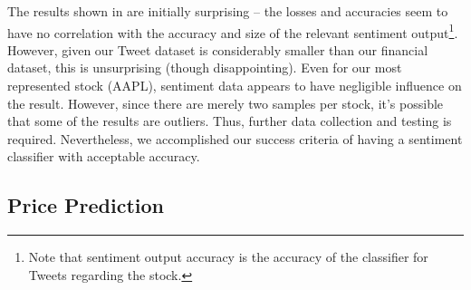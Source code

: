 \documentclass[12pt,a4paper,twoside,openright]{report}
\begin{document}
The results shown in  are initially surprising -- the losses and accuracies 
seem to have no correlation with the accuracy and size of the relevant sentiment output\footnote{Note that sentiment output
accuracy is the accuracy of the classifier for Tweets regarding the stock.}. However, given
our Tweet dataset is considerably smaller than our financial dataset, this is unsurprising (though disappointing).
Even for our most represented stock (AAPL), sentiment data appears to have negligible influence on the result.
However, since there are merely two samples per stock, it's possible that some of the results are outliers.
Thus, further data collection and testing is required.
Nevertheless, we accomplished our success criteria of having a sentiment classifier with acceptable
accuracy.

\subsection{Price Prediction}
\label{sec:evalPred}
\end{document}
